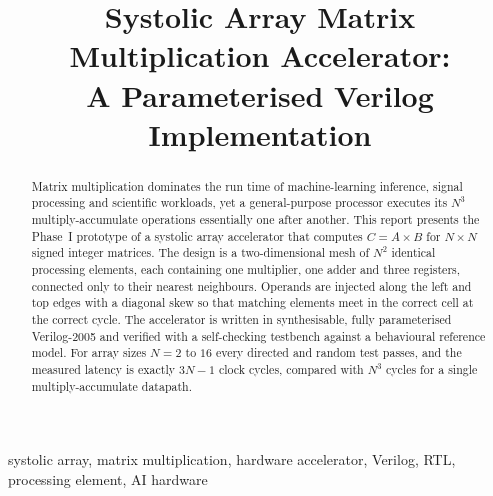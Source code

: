 \documentclass[conference]{IEEEtran}
\begin{document}
\title{Systolic Array Matrix Multiplication Accelerator:\\A Parameterised Verilog Implementation}

\author{
}

\maketitle

\begin{abstract}
Matrix multiplication dominates the run time of machine-learning inference,
signal processing and scientific workloads, yet a general-purpose processor
executes its $N^3$ multiply-accumulate operations essentially one after another.
This report presents the Phase~I prototype of a systolic array accelerator that
computes $C = A \times B$ for $N \times N$ signed integer matrices. The design
is a two-dimensional mesh of $N^2$ identical processing elements, each
containing one multiplier, one adder and three registers, connected only to
their nearest neighbours. Operands are injected along the left and top edges
with a diagonal skew so that matching elements meet in the correct cell at the
correct cycle. The accelerator is written in synthesisable, fully parameterised
Verilog-2005 and verified with a self-checking testbench against a behavioural
reference model. For array sizes $N = 2$ to $16$ every directed and random test
passes, and the measured latency is exactly $3N-1$ clock cycles, compared with
$N^3$ cycles for a single multiply-accumulate datapath.
\end{abstract}

\begin{IEEEkeywords}
systolic array, matrix multiplication, hardware accelerator, Verilog, RTL,
processing element, AI hardware
\end{IEEEkeywords}
\end{document}
